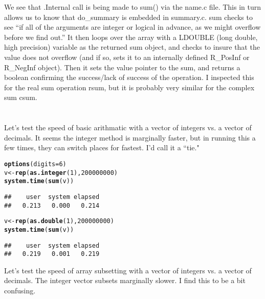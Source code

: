 \documentclass{article}\usepackage[]{graphicx}\usepackage[]{color}
\makeatletter
\newcommand{\hlnum}[1]{\textcolor[rgb]{0.686,0.059,0.569}{#1}}%
\newcommand{\hlstd}[1]{\textcolor[rgb]{0.345,0.345,0.345}{#1}}%
\newcommand{\hlkwb}[1]{\textcolor[rgb]{0.69,0.353,0.396}{#1}}%
\newcommand{\hlkwc}[1]{\textcolor[rgb]{0.333,0.667,0.333}{#1}}%
\newcommand{\hlkwd}[1]{\textcolor[rgb]{0.737,0.353,0.396}{\textbf{#1}}}%
\newenvironment{kframe}{%
 \def\at@end@of@kframe{}%
 \ifinner\ifhmode%
  \def\at@end@of@kframe{\end{minipage}}%
  \begin{minipage}{\columnwidth}%
 \fi\fi%
 \def\FrameCommand##1{\hskip\@totalleftmargin \hskip-\fboxsep
 \colorbox{shadecolor}{##1}\hskip-\fboxsep
     \hskip-\linewidth \hskip-\@totalleftmargin \hskip\columnwidth}%
 \MakeFramed {\advance\hsize-\width
   \@totalleftmargin\z@ \linewidth\hsize
   \@setminipage}}%
 {\par\unskip\endMakeFramed%
 \at@end@of@kframe}
\newenvironment{knitrout}{}{} %
\makeatother
\begin{document}
We see that .Internal call is being made to sum() via the name.c file.  This in turn allows us to know that do\_summary is embedded in summary.c.  sum checks to see ``if all of the arguments are integer or logical in advance, as we might overflow before we find out.''  It then loops over the array with a LDOUBLE (long double, high precision) variable as the returned sum object, and checks to insure that the value does not overflow (and if so, sets it to an internally defined R\_PosInf or R\_NegInf object).  Then it sets the value pointer to the sum, and returns a boolean confirming the success/lack of success of the operation.  I inspected this for the real sum operation rsum, but it is probably very similar for the complex sum csum.


\section{}

Let's test the speed of basic arithmatic with a vector of integers vs. a vector of decimals.  It seems the integer method is marginally faster, but in running this a few times, they can switch places for fastest.  I'd call it a ``tie."

\begin{knitrout}
\color{fgcolor}\begin{kframe}
\begin{alltt}
\hlkwd{options}\hlstd{(}\hlkwc{digits}\hlstd{=}\hlnum{6}\hlstd{)}
\hlstd{v} \hlkwb{<-} \hlkwd{rep}\hlstd{(}\hlkwd{as.integer}\hlstd{(}\hlnum{1}\hlstd{),} \hlnum{200000000}\hlstd{)}
\hlkwd{system.time}\hlstd{(}\hlkwd{sum}\hlstd{(v))}
\end{alltt}
\begin{verbatim}
##    user  system elapsed 
##   0.213   0.000   0.214
\end{verbatim}
\begin{alltt}
\hlstd{v} \hlkwb{<-} \hlkwd{rep}\hlstd{(}\hlkwd{as.double}\hlstd{(}\hlnum{1}\hlstd{),} \hlnum{200000000}\hlstd{)}
\hlkwd{system.time}\hlstd{(}\hlkwd{sum}\hlstd{(v))}
\end{alltt}
\begin{verbatim}
##    user  system elapsed 
##   0.219   0.001   0.219
\end{verbatim}
\end{kframe}
\end{knitrout}

Let's test the speed of array subsetting with a vector of integers vs. a vector of decimals.  The integer vector subsets marginally slower.  I find this to be a bit confusing.
\end{document}
